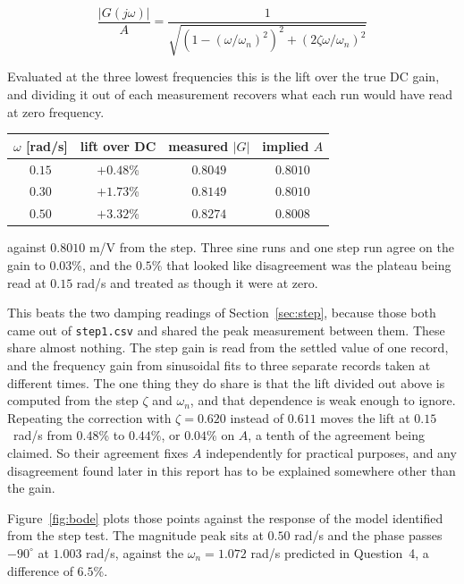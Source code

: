 \begin{equation}\label{eqn:maglift}
    \frac{|G(j\omega)|}{A} =
    \frac{1}{\sqrt{\left(1 - (\omega/\omega_n)^2\right)^2 + \left(2\zeta\omega/\omega_n\right)^2}}
\end{equation}

Evaluated at the three lowest frequencies this is the lift over the true DC gain, and
dividing it out of each measurement recovers what each run would have read at zero
frequency.

\begin{center}
\begin{tabular}{cccc}
\toprule
$\omega$ [rad/s] & lift over DC & measured $|G|$ & implied $A$ \\
\midrule
$0.15$ & $+0.48$\% & $0.8049$ & $0.8010$ \\
$0.30$ & $+1.73$\% & $0.8149$ & $0.8010$ \\
$0.50$ & $+3.32$\% & $0.8274$ & $0.8008$ \\
\bottomrule
\end{tabular}
\end{center}

against $0.8010$ m/V from the step. Three sine runs and one step run agree on the gain to
$0.03$\%, and the $0.5$\% that looked like disagreement was the plateau being read at
$0.15$ rad/s and treated as though it were at zero.

This beats the two damping readings of Section~\ref{sec:step}, because those both came out of
\texttt{step1.csv} and shared the peak measurement between them. These share almost nothing. The
step gain is read from the settled value of one record, and the frequency gain from
sinusoidal fits to three separate records taken at different times. The one thing they do share
is that the lift divided out above is computed from the step $\zeta$ and $\omega_n$, and that
dependence is weak enough to ignore. Repeating the correction with $\zeta = 0.620$ instead of
$0.611$ moves the lift at $0.15$~rad/s from $0.48$\% to $0.44$\%, or $0.04$\% on $A$, a tenth
of the agreement being claimed. So their agreement fixes $A$ independently for practical
purposes, and any disagreement found later in this report has to be explained somewhere other
than the gain.

Figure~\ref{fig:bode} plots those points against the response of the model identified from
the step test. The magnitude peak sits at $0.50$ rad/s and the phase
passes $-90^\circ$ at $1.003$ rad/s, against the $\omega_n = 1.072$
rad/s predicted in Question~4, a difference of $6.5$\%.

